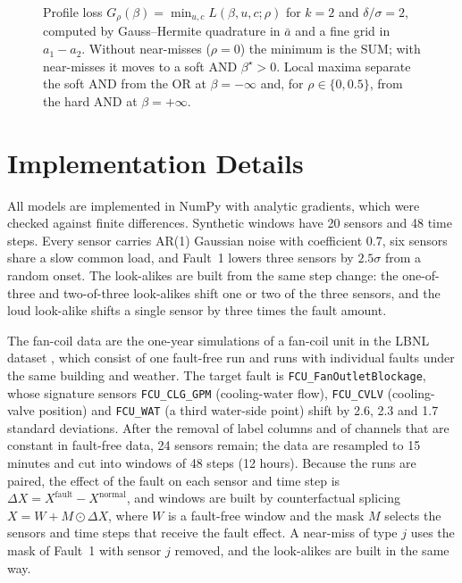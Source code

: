 \begin{figure}[h]
\centering
{}
\caption{Profile loss $G_\rho(\beta)=\min_{u,c}L(\beta,u,c;\rho)$ for $k=2$ and $\delta/\sigma=2$, computed by Gauss--Hermite quadrature in $\bar a$ and a fine grid in $a_1-a_2$. Without near-misses ($\rho=0$) the minimum is the SUM; with near-misses it moves to a soft AND $\beta^\star>0$. Local maxima separate the soft AND from the OR at $\beta=-\infty$ and, for $\rho\in\{0,0.5\}$, from the hard AND at $\beta=+\infty$.}\label{fig:landscape}
\end{figure}

\section{Implementation Details}\label{app:expdetails}

All models are implemented in NumPy with analytic gradients, which were checked against finite differences. Synthetic windows have 20 sensors and 48 time steps. Every sensor carries AR(1) Gaussian noise with coefficient 0.7, six sensors share a slow common load, and Fault~1 lowers three sensors by $2.5\sigma$ from a random onset. The look-alikes are built from the same step change: the one-of-three and two-of-three look-alikes shift one or two of the three sensors, and the loud look-alike shifts a single sensor by three times the fault amount.

The fan-coil data are the one-year simulations of a fan-coil unit in the LBNL dataset \citep{granderson2023}, which consist of one fault-free run and runs with individual faults under the same building and weather. The target fault is \texttt{FCU\_FanOutletBlockage}, whose signature sensors \texttt{FCU\_CLG\_GPM} (cooling-water flow), \texttt{FCU\_CVLV} (cooling-valve position) and \texttt{FCU\_WAT} (a third water-side point) shift by 2.6, 2.3 and 1.7 standard deviations. After the removal of label columns and of channels that are constant in fault-free data, 24 sensors remain; the data are resampled to 15 minutes and cut into windows of 48 steps (12 hours). Because the runs are paired, the effect of the fault on each sensor and time step is $\Delta X=X^{\mathrm{fault}}-X^{\mathrm{normal}}$, and windows are built by counterfactual splicing $X=W+M\odot\Delta X$, where $W$ is a fault-free window and the mask $M$ selects the sensors and time steps that receive the fault effect. A near-miss of type $j$ uses the mask of Fault~1 with sensor $j$ removed, and the look-alikes are built in the same way.

